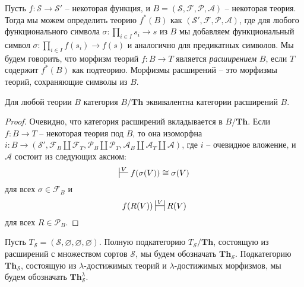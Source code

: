 \documentclass[reqno]{amsart}
\theoremstyle{definition}
\theoremstyle{remark}
\newcommand{\bcat}[1]{\mathbf{#1}}
\newcommand{\Th}{\bcat{Th}}
\begin{document}
Пусть $f : \mathcal{S} \to \mathcal{S}'$ -- некоторая функция, и $B = (\mathcal{S},\mathcal{F},\mathcal{P},\mathcal{A})$ -- некоторая теория.
Тогда мы можем определить теорию $f^*(B)$ как $(\mathcal{S}',\mathcal{F},\mathcal{P},\mathcal{A})$,
где для любого функционального символа $\sigma : \prod_{i \in I} s_i \to s$ из $B$ мы добавляем функциональный символ $\sigma : \prod_{i \in I} f(s_i) \to f(s)$ и аналогично для предикатных символов.
Мы будем говорить, что морфизм теорий $f : B \to T$ является \emph{расширением} $B$, если $T$ содержит $f^*(B)$ как подтеорию.
Морфизмы расширений -- это морфизмы теорий, сохраняющие символы из $B$.

\begin{lem}[th-ext]
Для любой теории $B$ категория $B/\Th$ эквивалентна категории расширений $B$.
\end{lem}
\begin{proof}
Очевидно, что категория расширений вкладывается в $B/\Th$.
Если $f : B \to T$ -- некоторая теория под $B$, то она изоморфна $i : B \to (\mathcal{S}', \mathcal{F}_B \amalg \mathcal{F}_T, \mathcal{P}_B \amalg \mathcal{P}_T, \mathcal{A}_B \amalg \mathcal{A}_T \amalg \mathcal{A})$,
где $i$ -- очевидное вложение, и $\mathcal{A}$ состоит из следующих аксиом:
\[ \sststile{}{V} f(\sigma(V)) \cong \sigma(V) \]
для всех $\sigma \in \mathcal{F}_B$ и
\[ f(R(V)) \ssststile{}{V} R(V) \]
для всех $R \in \mathcal{P}_B$.
\end{proof}

Пусть $T_\mathcal{S} = (\mathcal{S},\varnothing,\varnothing,\varnothing)$.
Полную подкатегорию $T_\mathcal{S}/\Th$, состоящую из расширений с множеством сортов $\mathcal{S}$, мы будем обозначать $\Th_\mathcal{S}$.
Подкатегорию $\Th_\mathcal{S}$, состоящую из $\lambda$-достижимых теорий и $\lambda$-достижимых морфизмов, мы будем обозначать $\Th_\mathcal{S}^\lambda$.
\end{document}
